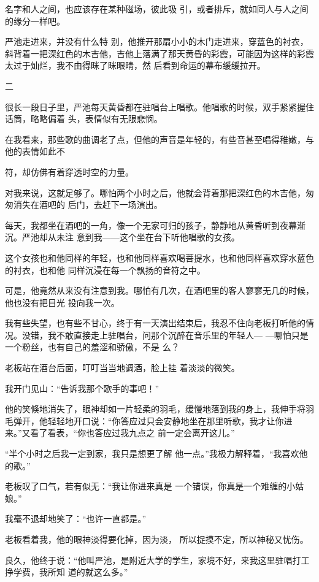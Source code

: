 \documentclass{article}
\begin{document}
名字和人之间，也应该存在某种磁场，彼此吸
引，或者排斥，就如同人与人之间的缘分一样吧。 

严池走进来，并没有什么特 别，他推开那扇小小的木门走进来，穿蓝色的衬衣，斜背着一把深红色的木吉他，吉他上落满了那天黄昏的彩霞，可能因为这样的彩霞太过于灿烂，我不由得眯了眯眼睛，然
后看到命运的幕布缓缓拉开。 


二 

很长一段日子里，严池每天黄昏都在驻唱台上唱歌。他唱歌的时候，双手紧紧握住话筒，略略偏着
头，表情似有无限悲悯。 

在我看来，那些歌的曲调老了点，但他的声音是年轻的，有些音甚至唱得稚嫩，与他的表情如此不
\newpage

符，却仿佛有着穿透时空的力量。 

对我来说，这就足够了。哪怕两个小时之后，他就会背着那把深红色的木吉他，匆匆消失在酒吧的
后门，去赶下一场演出。 

每天，我都坐在酒吧的一角，像一个无家可归的孩子，静静地从黄昏听到夜幕渐沉。严池却从未注
意到我——这个坐在台下听他唱歌的女孩。 

这个女孩也和他同样的年轻，也和他同样喜欢喝菩提水，也和他同样喜欢穿水蓝色的衬衣，也和他
同样沉浸在每一个飘扬的音符之中。 

可是，他竟然从来没有注意到我。哪怕有几次，在酒吧里的客人寥寥无几的时候，他也没有把目光
投向我一次。 

我有些失望，也有些不甘心，终于有一天演出结束后，我忍不住向老板打听他的情况。没错，我不敢直接走上驻唱台，问那个沉醉在音乐里的年轻人—
\newpage
—哪怕只是一个粉丝，也有自己的羞涩和骄傲，不是
么？ 

老板站在酒台后面，叮叮当当地调酒，脸上挂
着淡淡的微笑。 


我开门见山：“告诉我那个歌手的事吧！” 

他的笑倏地消失了，眼神却如一片轻柔的羽毛，缓慢地落到我的身上，我伸手将羽毛弹开，他轻轻地开口说：“你答应过只会安静地坐在那里听歌，我才让你进来。”又看了看表，“你也答应过我九点之
前一定会离开这儿。” 

“半个小时之后我一定到家，我只是想更了解
他一点。”我极力解释着，“我喜欢他的歌。” 

老板叹了口气，若有似无：“我让你进来真是
一个错误，你真是一个难缠的小姑娘。” 


\newpage

我毫不退却地笑了：“也许一直都是。” 

老板看着我，他的眼神淡得要化掉，因为淡，
所以捉摸不定，所以神秘又忧伤。 

良久，他终于说：“他叫严池，是附近大学的学生，家境不好，来我这里驻唱打工挣学费，我所知
道的就这么多。” 
\end{document}
